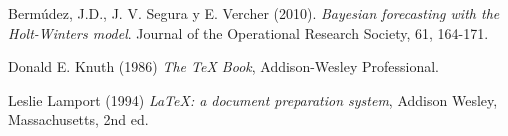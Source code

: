  Berm\'udez, J.D., J. V. Segura y E. Vercher (2010). \emph{Bayesian forecasting with the Holt-Winters model}. Journal of the Operational Research Society, 61, 164-171.

Donald E. Knuth (1986) \emph{The \TeX{} Book}, Addison-Wesley Professional.

Leslie Lamport (1994) \emph{\LaTeX: a document preparation system}, Addison
Wesley, Massachusetts, 2nd ed.
